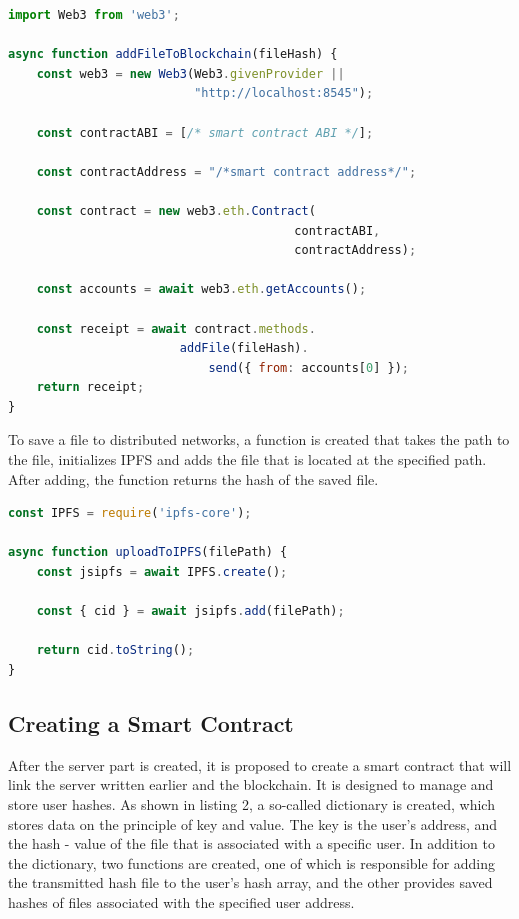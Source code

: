 \documentclass[10pt,conference,a4paper]{IEEEtran_EDM}
\begin{document}

\begin{lstlisting}[language=JavaScript, caption=JavaScript code implementing saving to the blockchain]
import Web3 from 'web3';

async function addFileToBlockchain(fileHash) {
    const web3 = new Web3(Web3.givenProvider ||
                          "http://localhost:8545");

    const contractABI = [/* smart contract ABI */];

    const contractAddress = "/*smart contract address*/";

    const contract = new web3.eth.Contract(
                                        contractABI,
                                        contractAddress);

    const accounts = await web3.eth.getAccounts();

    const receipt = await contract.methods.
                        addFile(fileHash).
                            send({ from: accounts[0] });
    return receipt;
}
\end{lstlisting}

To save a file to distributed networks, a function is created that takes the path to the file, initializes IPFS and adds the file that is located at the specified path.
After adding, the function returns the hash of the saved file.

\begin{lstlisting}[language=JavaScript, caption= Saving a file to IPFS]
const IPFS = require('ipfs-core');

async function uploadToIPFS(filePath) {
    const jsipfs = await IPFS.create();

    const { cid } = await jsipfs.add(filePath);

    return cid.toString();
}
\end{lstlisting}

\subsection{Creating a Smart Contract}
After the server part is created, it is proposed to create a smart contract that will link the server written earlier and the blockchain.
It is designed to manage and store user hashes.
As shown in listing 2, a so-called dictionary is created, which stores data on the principle of key and value.
The key is the user's address, and the hash - value of the file that is associated with a specific user.
In addition to the dictionary, two functions are created, one of which is responsible for adding the transmitted hash file to the user's hash array, and the other provides saved hashes of files associated with the specified user address.
\end{document}
